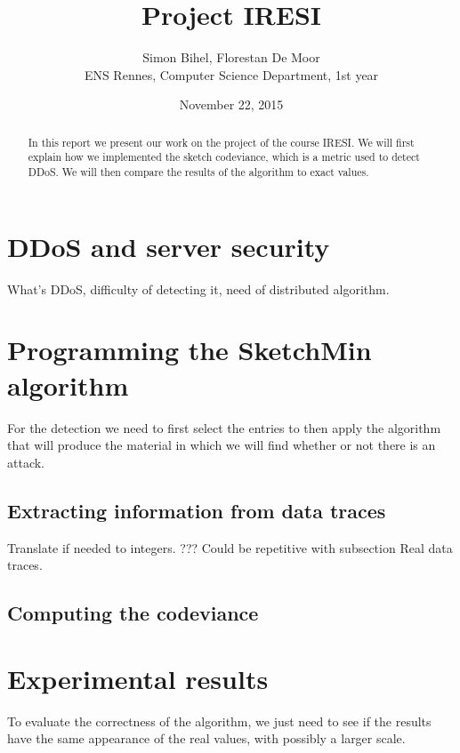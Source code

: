 \documentclass[a4paper]{article}%
\begin{document}
\title{Project IRESI}

\author{Simon Bihel, Florestan De Moor \\ ENS Rennes, Computer Science Department, 1st year}

\date{November 22, 2015}

\maketitle

\begin{abstract}
	In this report we present our work on the project of the course IRESI. We will first explain how we implemented the sketch codeviance, which is a metric used to detect DDoS. We will then compare the results of the algorithm to exact values.
\end{abstract}


\section{DDoS and server security}
What's DDoS, difficulty of detecting it, need of distributed algorithm.


\section{Programming the SketchMin algorithm}
For the detection we need to first select the entries to then apply the algorithm that will produce the material in which we will find whether or not there is an attack.

\subsection{Extracting information from data traces}
Translate if needed to integers. ??? Could be repetitive with subsection Real data traces.

\subsection{Computing the codeviance}

\section{Experimental results}
To evaluate the correctness of the algorithm, we just need to see if the results have the same appearance of the real values, with possibly a larger scale.
\end{document}

